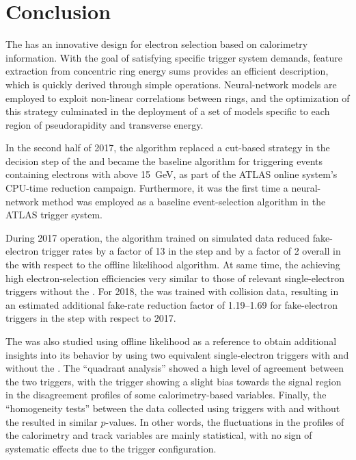 \section{Conclusion}\label{sec:conclusion}


The \rnn{} has an innovative design for electron selection based on
calorimetry information. With the
goal of satisfying specific trigger system demands, feature extraction
from concentric ring energy sums provides an efficient description, which is quickly derived through simple operations. 
Neural-network models are employed to exploit non-linear correlations between rings, and the optimization of this strategy 
culminated in the deployment of a set of models specific to each region of pseudorapidity and transverse energy. 


In the second half of 2017, the \rnn{} algorithm replaced a cut-based strategy
in the \fastcalo{} decision step of the \hlt{} and became the baseline algorithm
for triggering events containing electrons with \ET above \SI{15}{\GeV}, 
as part of the ATLAS online system's CPU-time reduction campaign. 
Furthermore, it was the first time a neural-network method was employed as a baseline event-selection algorithm in the ATLAS trigger system.


During 2017 operation, the \rnn{} algorithm trained on simulated data reduced fake-electron trigger rates by a factor of 13 in the \fastcalo{} step and by a factor of 2 overall in the \hlt{} with respect to the offline likelihood algorithm. At same time, the \rnn{} achieving high electron-selection efficiencies very similar to those of relevant single-electron triggers without the \rnn{}. For 2018, the \rnn{} was trained with collision data, resulting in an estimated additional fake-rate reduction factor of 1.19--1.69 for fake-electron triggers in the \fastcalo{} step with respect to 2017. 


The \rnn{} was also studied using offline likelihood as a reference to obtain additional insights into its behavior by using two equivalent single-electron triggers with and without the \rnn{}. 
The \enquote{quadrant analysis} showed a high level of agreement between the two triggers, with the \rnn{} trigger showing a slight bias towards the signal region in the disagreement profiles of some calorimetry-based variables. Finally, the \enquote{homogeneity tests} between the data collected using triggers with and without the \rnn{} resulted in similar $p$-values. In other words, the fluctuations in the profiles of the calorimetry and track variables are mainly statistical, with no sign of systematic effects due to the trigger configuration.



